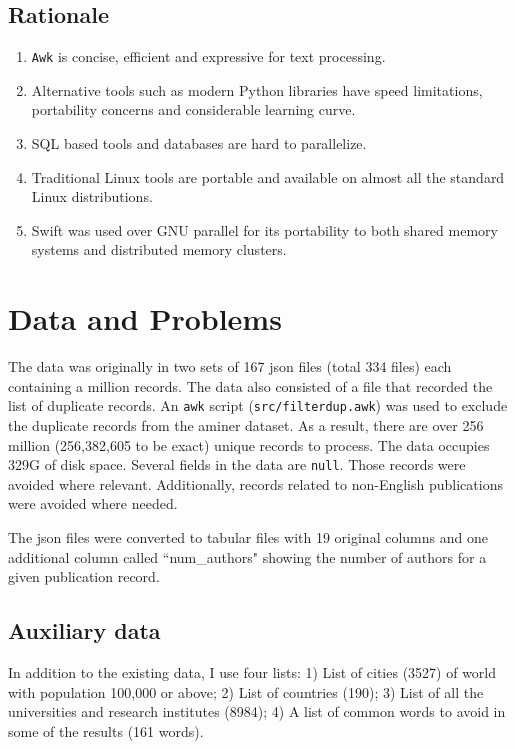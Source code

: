 \documentclass{article}
\begin{document}
\subsection*{Rationale}
\begin{enumerate}
\item \texttt{Awk} is concise, efficient and expressive for text processing.
\item Alternative tools such as modern Python libraries have speed limitations, portability concerns and considerable learning curve.
\item SQL based tools and databases are hard to parallelize.
\item Traditional Linux tools are portable and available on almost all the standard Linux distributions.
\item Swift was used over GNU parallel for its portability to both shared memory systems and distributed memory clusters.
\end{enumerate}

\section*{Data and Problems}
The data was originally in two sets of 167 json files (total 334 files) each
containing a million records. The data also consisted of a file that recorded
the list of duplicate records. An \texttt{awk} script (\texttt{src/filterdup.awk}) was used to exclude the
duplicate records from the aminer dataset. As a result, there are over 256
million (256,382,605 to be exact) unique records to process. The data occupies
329G of disk space. Several fields in the data are \texttt{null}. Those records
were avoided where relevant. Additionally, records related to non-English
publications were avoided where needed.

The json files were converted to tabular files with 19 original columns and one
additional column called ``num\_authors" showing the number of authors for a given
publication record.

\subsection*{Auxiliary data}
In addition to the existing data, I use four lists: 1) List of cities (3527) of
world with population 100,000 or above; 2) List of countries (190);
3) List of all the universities and research institutes (8984); 4) A list of common
words to avoid in some of the results (161 words).
\end{document}
